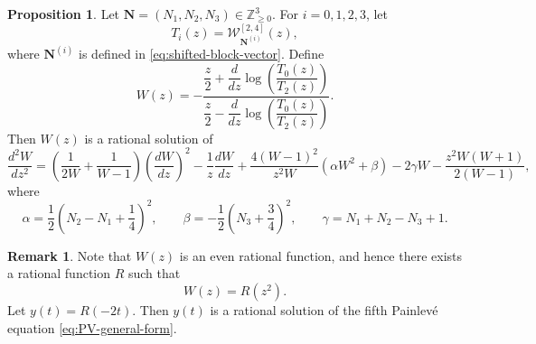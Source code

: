 \documentclass[preprint,3p,10pt]{elsarticle}
\theoremstyle{definition}
\newtheorem{remark}{Remark}[section]
\newtheorem{proposition}[definition]{Proposition}
\begin{document}
\begin{proposition}
\label{prop:4-reduced-WH-PV-z-form}
Let \(\mathbf N=(N_1,N_2,N_3)\in\mathbb Z_{\ge0}^3\).  For
\(i=0,1,2,3\), let
\begin{equation}
    T_i(z)
    =
    \mathcal W_{\mathbf N^{(i)}}^{[2,4]}(z),
\end{equation}
where \(\mathbf N^{(i)}\) is defined in \eqref{eq:shifted-block-vector}.
Define
\begin{equation}
\label{eq:4-reduced-WH-PV-z-solution}
    W(z)
    =
    -
    \frac{
        \dfrac{z}{2}
        +
        \dfrac{d}{dz}
        \log\left(\dfrac{T_0(z)}{T_2(z)}\right)
    }{
        \dfrac{z}{2}
        -
        \dfrac{d}{dz}
        \log\left(\dfrac{T_0(z)}{T_2(z)}\right)
    }.
\end{equation}
Then \(W(z)\) is a rational solution of
\begin{equation}
\label{eq:PV-pullback-z-form}
    \frac{d^2 W}{dz^2}
    =
    \left(
        \frac{1}{2W}
        +
        \frac{1}{W-1}
    \right)
    \left(\frac{dW}{dz}\right)^2
    -
    \frac{1}{z}\frac{dW}{dz}
    +
    \frac{4(W-1)^2}{z^2W}
    \left(
        \alpha W^2+\beta
    \right)
    -
    2\gamma W
    -
    \frac{z^2W(W+1)}{2(W-1)} ,
\end{equation}
where
\begin{equation}
\label{eq:4-reduced-WH-PV-parameters}
    \alpha
    =
    \frac12
    \left(
        N_2-N_1+\frac14
    \right)^2,
    \qquad
    \beta
    =
    -\frac12
    \left(
        N_3+\frac34
    \right)^2,
    \qquad
    \gamma
    =
    N_1+N_2-N_3+1.
\end{equation}
\end{proposition}


\begin{remark}
Note that \(W(z)\) is an even rational function, and hence there exists a rational function $R$ such that
\begin{equation}
    W(z)=R(z^2).
\end{equation}
Let \(y(t)=R(-2t)\). Then \(y(t)\) is a rational solution of  the fifth Painlev\'e equation
\eqref{eq:PV-general-form}.
\end{remark}
\end{document}
